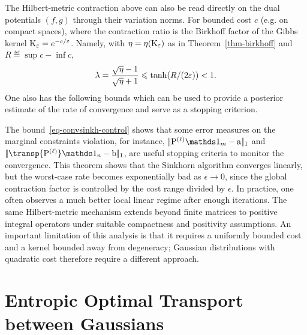 The Hilbert-metric contraction above can also be read directly on the dual potentials $(f,g)$ through their variation norms. For bounded cost $c$ (e.g. on compact spaces),
where the contraction ratio is the Birkhoff factor of the Gibbs kernel $\mathrm{K}_\varepsilon=e^{-c/\varepsilon}$. Namely, with $\eta=\eta(\mathrm{K}_\varepsilon)$ as in Theorem~\ref{thm-birkhoff} and $R\eqdef\sup c-\inf c$,
\[
	\lambda=\frac{\sqrt{\eta}-1}{\sqrt{\eta}+1}
	\leqslant
	\tanh(R/(2\varepsilon))<1 .
\]
One also has the following bounds
which can be used to provide a posterior estimate of the rate of convergence and serve as a stopping criterion.



The bound~\eqref{eq-convsinkh-control} shows that some error measures on the marginal constraints violation, for instance, $\norm{\it{\P} \ones_m - \a}_1$ and $\norm{\transp{\it{\P}} \ones_n - \b}_1$, are useful stopping criteria to monitor the convergence.
This theorem shows that the Sinkhorn algorithm converges linearly, but the worst-case rate becomes exponentially bad as $\epsilon \rightarrow 0$, since the global contraction factor is controlled by the cost range divided by $\epsilon$. In practice, one often observes a much better local linear regime after enough iterations.
%
The same Hilbert-metric mechanism extends beyond finite matrices to positive integral operators under suitable compactness and positivity assumptions.
%
An important limitation of this analysis is that it requires a uniformly bounded cost and a kernel bounded away from degeneracy; Gaussian distributions with quadratic cost therefore require a different approach.

\section{Entropic Optimal Transport between Gaussians}
\label{sec-gaussian-sinkhorn}

